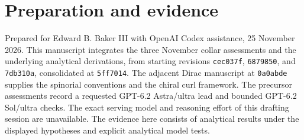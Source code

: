 \documentclass[11pt]{article}
\theoremstyle{remark}
\begin{document}
\section*{Preparation and evidence}
Prepared for Edward B. Baker III with OpenAI Codex assistance, 25 November 2026. This manuscript integrates the three November collar assessments and the underlying analytical derivations, from starting revisions \texttt{cec037f}, \texttt{6879850}, and \texttt{7db310a}, consolidated at \texttt{5ff7014}. The adjacent Dirac manuscript at \texttt{0a0abde} supplies the spinorial conventions and the chiral curl framework. The precursor assessments record a requested GPT-6.2 Astra/ultra lead and bounded GPT-6.2 Sol/ultra checks. The exact serving model and reasoning effort of this drafting session are unavailable. The evidence here consists of analytical results under the displayed hypotheses and explicit analytical model tests.



\end{document}
